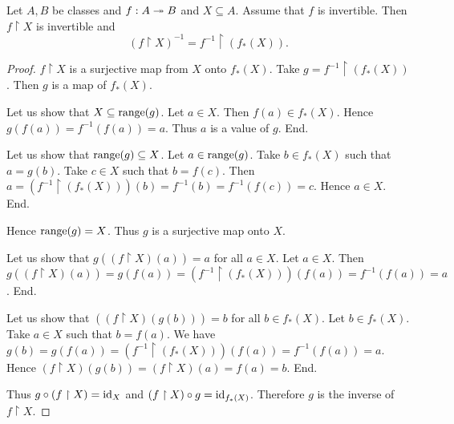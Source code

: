 \documentclass[10pt]{article}
\begin{document}
  \begin{forthel}
    \begin{proposition}
      Let $A, B$ be classes and $f : A \twoheadrightarrow B$ and $X \subseteq A$.
      Assume that $f$ is invertible.
      Then $f \restriction X$ is invertible and
      \[ (f\restriction X)^{-1} = f^{-1} \restriction (f_{*}(X)). \]
    \end{proposition}
    \begin{proof}
      $f \restriction X$ is a surjective map from $X$ onto $f_{*}(X)$.
      Take $g = f^{-1} \restriction (f_{*}(X))$.
      Then $g$ is a map of $f_{*}(X)$.

      Let us show that $X \subseteq \textrm{range}(g)$.
        Let $a \in X$.
        Then $f(a) \in f_{*}(X)$.
        Hence $g(f(a)) = f^{-1}(f(a)) = a$.
        Thus $a$ is a value of $g$.
      End.

      Let us show that $\textrm{range}(g) \subseteq X$.
        Let $a \in \textrm{range}(g)$.
        Take $b \in f_{*}(X)$ such that $a = g(b)$.
        Take $c \in X$ such that $b = f(c)$.
        Then $a
          = (f^{-1} \restriction (f_{*}(X)))(b)
          = f^{-1}(b)
          = f^{-1}(f(c))
          = c$.
        Hence $a \in X$.
      End.

      Hence $\textrm{range}(g) = X$.
      Thus $g$ is a surjective map onto $X$.

      Let us show that $g((f \restriction X)(a)) = a$ for all $a \in X$.
        Let $a \in X$.
        Then $g((f \restriction X)(a))
          = g(f(a))
          = (f^{-1} \restriction (f_{*}(X)))(f(a))
          = f^{-1}(f(a))
          = a$.
      End.

      Let us show that $((f \restriction X)(g(b))) = b$ for all $b \in f_{*}(X)$.
        Let $b \in f_{*}(X)$.
        Take $a \in X$ such that $b = f(a)$.
        We have $g(b)
          = g(f(a))
          = (f^{-1} \restriction (f_{*}(X)))(f(a))
          = f^{-1}(f(a))
          = a$.
        Hence $(f \restriction X)(g(b))
          = (f \restriction X)(a)
          = f(a)
          = b$.
      End.

      Thus $g \circ (f \restriction X) = \textrm{id}_{X}$ and
      $(f \restriction X) \circ g = \textrm{id}_{f_{*}(X)}$.
      Therefore $g$ is the inverse of $f \restriction X$.
    \end{proof}
  \end{forthel}
\end{document}
